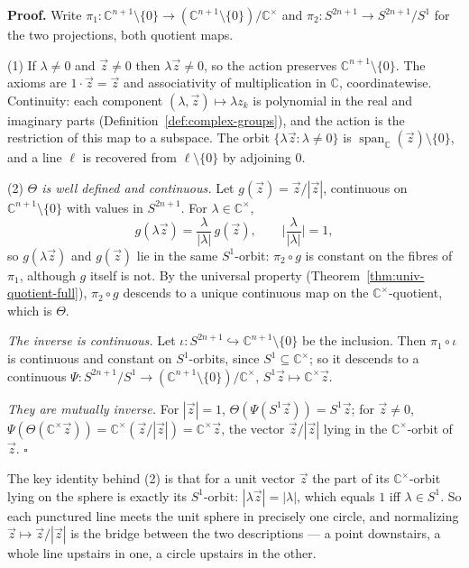 \documentclass[11pt]{report}
\renewenvironment{proof}[1][Proof]{\noindent\textbf{#1.} }{\hfill$\square$\par\vspace{5pt}}
\begin{document}
\begin{proof}
Write $\pi_1 : \mathbb{C}^{n+1}\setminus\{0\} \to (\mathbb{C}^{n+1}\setminus\{0\})/\mathbb{C}^\times$ and $\pi_2 : S^{2n+1} \to S^{2n+1}/S^1$ for the two projections, both quotient maps.

(1) If $\lambda \neq 0$ and $\vec z \neq 0$ then $\lambda\vec z \neq 0$, so the action preserves $\mathbb{C}^{n+1}\setminus\{0\}$. The axioms are $1 \cdot \vec z = \vec z$ and associativity of multiplication in $\mathbb{C}$, coordinatewise. Continuity: each component $(\lambda, \vec z) \mapsto \lambda z_k$ is polynomial in the real and imaginary parts (Definition~\ref{def:complex-groups}), and the action is the restriction of this map to a subspace. The orbit $\{\lambda\vec z : \lambda \neq 0\}$ is $\operatorname{span}_{\mathbb{C}}(\vec z) \setminus \{0\}$, and a line $\ell$ is recovered from $\ell \setminus \{0\}$ by adjoining $0$.

(2) \emph{$\Theta$ is well defined and continuous.} Let $g(\vec z) = \vec z/|\vec z|$, continuous on $\mathbb{C}^{n+1} \setminus \{0\}$ with values in $S^{2n+1}$. For $\lambda \in \mathbb{C}^\times$,
\[
g(\lambda\vec z) = \frac{\lambda}{|\lambda|}\, g(\vec z), \qquad \Big|\frac{\lambda}{|\lambda|}\Big| = 1,
\]
so $g(\lambda\vec z)$ and $g(\vec z)$ lie in the same $S^1$-orbit: $\pi_2 \circ g$ is constant on the fibres of $\pi_1$, although $g$ itself is not. By the universal property (Theorem~\ref{thm:univ-quotient-full}), $\pi_2 \circ g$ descends to a unique continuous map on the $\mathbb{C}^\times$-quotient, which is $\Theta$.

\emph{The inverse is continuous.} Let $\iota : S^{2n+1} \hookrightarrow \mathbb{C}^{n+1}\setminus\{0\}$ be the inclusion. Then $\pi_1 \circ \iota$ is continuous and constant on $S^1$-orbits, since $S^1 \subseteq \mathbb{C}^\times$; so it descends to a continuous $\Psi : S^{2n+1}/S^1 \to (\mathbb{C}^{n+1}\setminus\{0\})/\mathbb{C}^\times$, $S^1\vec z \mapsto \mathbb{C}^\times \vec z$.

\emph{They are mutually inverse.} For $|\vec z| = 1$, $\Theta(\Psi(S^1\vec z)) = S^1 \vec z$; for $\vec z \neq 0$, $\Psi(\Theta(\mathbb{C}^\times\vec z)) = \mathbb{C}^\times(\vec z/|\vec z|) = \mathbb{C}^\times\vec z$, the vector $\vec z/|\vec z|$ lying in the $\mathbb{C}^\times$-orbit of $\vec z$.
\end{proof}

\begin{rembox}\label{rem:new-spaces-7}
The key identity behind (2) is that for a unit vector $\vec z$ the part of its $\mathbb{C}^\times$-orbit lying on the sphere is exactly its $S^1$-orbit: $|\lambda\vec z| = |\lambda|$, which equals $1$ iff $\lambda \in S^1$. So each punctured line meets the unit sphere in precisely one circle, and normalizing $\vec z \mapsto \vec z/|\vec z|$ is the bridge between the two descriptions --- a point downstairs, a whole line upstairs in one, a circle upstairs in the other.
\end{rembox}
\end{document}
